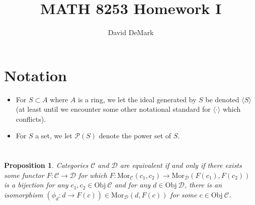\documentclass[english]{article}
\title{MATH 8253 Homework I}
\author{David DeMark}
\date{\due}
\newcommand{\mor}{\mathrm{Mor}}
\newcommand{\obj}{\mathrm{Obj}~}
\newcommand{\Pcal}{\mathcal{P}}
\newcommand{\Dcal}{\mathcal{D}}
\newcommand{\Ccal}{\mathcal{C}}
\newcommand{\prob}[1]{\setcounter{section}{#1-1}\section{}}
\newtheorem*{proposition*}{Proposition}
\theoremstyle{remark}
\theoremstyle{definition}
\begin{document}
\maketitle
\section*{Notation}
\begin{itemize}
\item For $S\subset A$ where $A$ is a ring, we let the ideal generated by $S$ be denoted $\langle S \rangle$ (at least until we encounter some other notational standard for $\langle\cdot \rangle$ which conflicts).
\item For $S$ a set, we let $\Pcal(S)$ denote the power set of $S$.
\end{itemize}
\prob{1}
\begin{proposition*}
	Categories $\Ccal$ and $\Dcal$ are equivalent if and only if there exists some functor $F:\Ccal\to\Dcal$ for which $F:\mor_\Ccal(c_1,c_2)\to\mor_\Dcal(F(c_1),F(c_2))$ is a bijection for any $c_1,c_2\in \obj\Ccal$ and for any $d\in \obj\Dcal$, there is an isomorphism $(\phi_d:d\to F(c))\in \mor_\Dcal(d,F(c))$ for some $c\in \obj\Ccal$. 
\end{proposition*}
\end{document}
